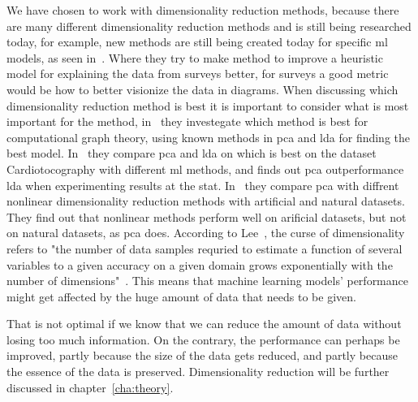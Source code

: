 We have chosen to work with dimensionality reduction methods, because there are many different dimensionality reduction methods and is still being researched today, 
for example, new methods are still being created today for specific \gls{ml} models, as seen in~\cite{dimensionality-reduction-cheng}. Where they try to make method to improve a heuristic model for explaining the data from surveys better, for surveys a good metric would be how to better visionize the data in diagrams. When discussing which dimensionality reduction method is best it is important to consider what is most important for the method, in~\cite{dimensionality-reduction-maitra} they investegate which method is best for computational graph theory, using known methods in \gls{pca} and \gls{lda} for finding the best model. In~\cite{dimensionality-reduction-reddy} they compare \gls{pca} and \gls{lda} on which is best on the dataset Cardiotocography with different \gls{ml} methods, and finds out \gls{pca} outperformance \gls{lda} when experimenting results at the stat. In~\cite{dimensionality-reduction-comparative-review} they compare \gls{pca} with diffrent nonlinear dimensionality reduction methods with artificial and natural datasets. They find out that nonlinear methods perform well on arificial datasets, but not on natural datasets, as \gls{pca} does. 
According to Lee~\cite{nonlinear-dim-red-chapter-one}, the curse of dimensionality refers to "the number of data samples requried to estimate a function of several variables to a given accuracy on a given domain grows exponentially with the number of dimensions"~\cite{nonlinear-dim-red-chapter-one}. This means that machine learning models' performance might get affected by the huge amount of data that needs to be given.

That is not optimal if we know that we can reduce the amount of data without losing too much information. On the contrary, the performance can perhaps be improved, partly because the size of the data gets reduced, and partly because the essence of the data is preserved. Dimensionality reduction will be further discussed in chapter~\ref{cha:theory}.  




